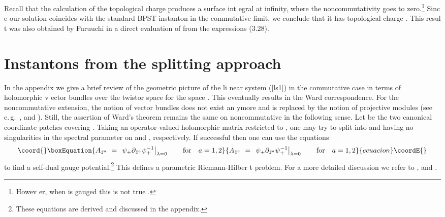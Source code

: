 \documentclass[a4paper,11pt,english]{article}
\numberwithin{equation}{section}
\renewcommand{\=}{\ =\ }
\begin{document}
Recall that the calculation of the topological charge produces a surface int%
egral at infinity, where the noncommutativity goes to zero.\footnote{Howev%
er, when \coordHE{} is gauged this is not true \cite{Furuuchi:2000vc}.} Sinc%
e our solution coincides with the standard BPST instanton in the commutative 
limit, we conclude that it has topological charge \coordHE{}. This resul%
t was also obtained by Furuuchi \cite{Furuuchi:2001dx} in a direct evaluation
of \coordHE{} from the expressions (3.28).


\section{Instantons from the splitting approach}

In the appendix we give a brief review of the geometric picture of the li%
near system (\ref{ls1}) in the commutative case in terms of holomorphic v%
ector bundles over the twistor space \coordHE{} for the space \coordHE{} \cite{Atiyah:1977pw,WardWells}. 
This eventually results in the Ward correspondence. For the noncommutative 
extension, the notion of vector bundles does not exist an%
ymore and is replaced by the notion of projective modules (see e.\,g.\ \cite{%
Nekrasov:2000ih}, \cite{Douglas:2001ba} and \cite{Konechny:2001wz}). Still,
the assertion of Ward's theorem remains the same on noncommutative 
\coordHE{} in the following sense. 
Let \coordHE{} be the two canonical coordinate patches covering 
\coordHE{}.  Taking an operator-valued %
 holomorphic matrix \coordHE{} restricted to \coordHE{},
one may try to split \coordHE{} into \myHighlight{$\psi%
_+$}\coordHE{} and \myHighlight{$\psi_-$}\coordHE{} having no singularities in the spectral parameter \myHighlight{$\lambda$}\coordHE{} 
on \coordHE{} and \coordHE{}, respectively. If successful then one can use the equations
\begin{equation}\coord{}\boxEquation{\label{eqfa1}
 {A}_{\bar{z}^a}\=\left.\psi_+\partial_{\bar{z}^a}\psi^{-1}_+\right|
_{\lambda=0}\qquad\text{for}\quad a=1,2
}{{A}_{\bar{z}^a}\=\left.\psi_+\partial_{\bar{z}^a}\psi^{-1}_+\right|
_{\lambda=0}\qquad\text{for}\quad a=1,2
}{ecuacion}\coordE{}\end{equation}
to find a self-dual gauge potential.\footnote{These equations are derived %
 and discussed in the appendix.} This defines a parametric Riemann-Hilber%
t problem. For a more detailed discussion we refer to \cite{Kapustin:2000ek%
}, \cite{Takasaki:2000vs} and \cite{Lechtenfeld:2001ie}.%
\end{document}
